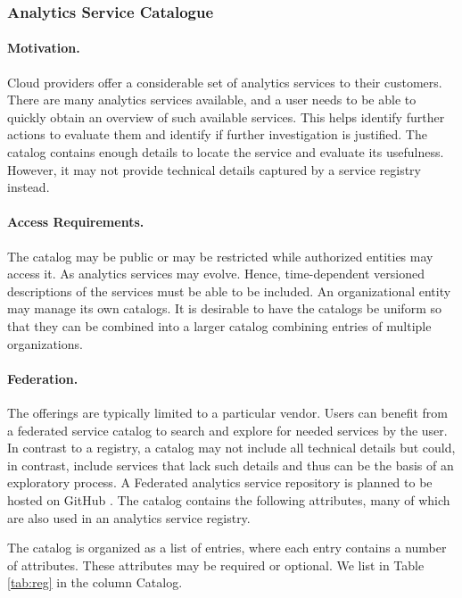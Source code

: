 
\subsubsection{Analytics Service Catalogue}
\label{sec:catalog}

\paragraph*{Motivation.}
Cloud providers offer a considerable set of analytics services to
their customers. There are many analytics services available, and a user
needs to be able to quickly obtain an overview of such available
services. This helps identify further actions to evaluate
them and identify if further investigation is justified. The catalog
contains enough details to locate the service and evaluate its
usefulness. However, it may not provide technical details 
captured by a service registry instead.

\paragraph*{Access Requirements.}
The catalog may be public or may be restricted while authorized
entities may access it. As analytics services may evolve. Hence,
time-dependent versioned descriptions of the services must be able to
be included. An organizational entity may manage its own
catalogs. It is desirable to have the catalogs be uniform so that
they can be combined into a larger catalog combining entries of
multiple organizations.

\paragraph*{Federation.}
The offerings are typically limited to a particular vendor. Users can
benefit from a federated service catalog to search and explore for
needed services by the user. In contrast to a registry, a catalog may
not include all technical details but could, in contrast, include
services that lack such details and thus can be the basis of an
exploratory process. A Federated analytics service repository is
planned to be hosted on GitHub . The catalog contains the
following attributes, many of which are also used in an analytics
service registry.

The catalog is organized as a list of entries, where each entry
contains a number of attributes. These attributes may be required or
optional. We list in Table \ref{tab:reg} in the column Catalog.


